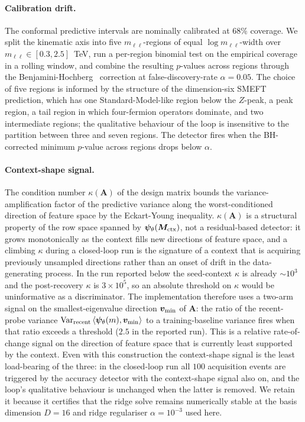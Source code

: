 \documentclass[11pt,a4paper]{article}
\newcommand{\mll}{m_{\ell\ell}}
\newcommand{\psib}{\bm{\psi}}
\begin{document}
\paragraph{Calibration drift.}
The conformal predictive intervals are nominally calibrated at $68\%$ coverage. We split the kinematic axis into five $\mll$-regions of equal $\log\mll$-width over $\mll \in [0.3, 2.5]$~TeV, run a per-region binomial test on the empirical coverage in a rolling window, and combine the resulting $p$-values across regions through the Benjamini-Hochberg~\cite{Benjamini:1995fdr} correction at false-discovery-rate $\alpha = 0.05$. The choice of five regions is informed by the structure of the dimension-six SMEFT prediction, which has one Standard-Model-like region below the $Z$-peak, a peak region, a tail region in which four-fermion operators dominate, and two intermediate regions; the qualitative behaviour of the loop is insensitive to the partition between three and seven regions. The detector fires when the BH-corrected minimum $p$-value across regions drops below $\alpha$.

\paragraph{Context-shape signal.}
The condition number $\kappa(\bm{A})$ of the design matrix bounds the variance-amplification factor of the predictive variance along the worst-conditioned direction of feature space by the Eckart-Young inequality. $\kappa(\bm{A})$ is a structural property of the row space spanned by $\psib_\theta(\bm{M}_{\rm ctx})$, not a residual-based detector: it grows monotonically as the context fills new directions of feature space, and a climbing $\kappa$ during a closed-loop run is the signature of a context that is acquiring previously unsampled directions rather than an onset of drift in the data-generating process. In the run reported below the seed-context $\kappa$ is already $\sim 10^3$ and the post-recovery $\kappa$ is $3 \times 10^5$, so an absolute threshold on $\kappa$ would be uninformative as a discriminator. The implementation therefore uses a two-arm signal on the smallest-eigenvalue direction $\bm{v}_{\rm min}$ of $\bm{A}$: the ratio of the recent-probe variance $\mathrm{Var}_{\rm recent}\,\langle \psib_\theta(m), \bm{v}_{\rm min}\rangle$ to a training-baseline variance fires when that ratio exceeds a threshold ($2.5$ in the reported run). This is a relative rate-of-change signal on the direction of feature space that is currently least supported by the context. Even with this construction the context-shape signal is the least load-bearing of the three: in the closed-loop run all $100$ acquisition events are triggered by the accuracy detector with the context-shape signal also on, and the loop's qualitative behaviour is unchanged when the latter is removed. We retain it because it certifies that the ridge solve remains numerically stable at the basis dimension $D = 16$ and ridge regulariser $\alpha = 10^{-3}$ used here.
\end{document}
